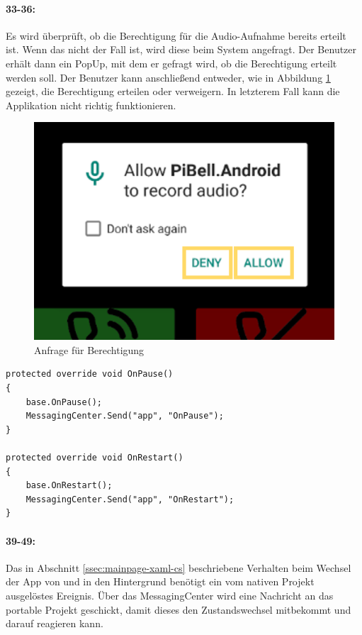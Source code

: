 \paragraph{33-36:} Es wird überprüft, ob die Berechtigung für die Audio-Aufnahme bereits erteilt ist.
Wenn das nicht der Fall ist, wird diese beim System angefragt.
Der Benutzer erhält dann ein PopUp, mit dem er gefragt wird, ob die Berechtigung erteilt werden soll.
Der Benutzer kann anschließend entweder, wie in Abbildung \ref{fig:permission} gezeigt, die Berechtigung erteilen oder verweigern.
In letzterem Fall kann die Applikation nicht richtig funktionieren.
\begin{figure}
    \centering
    \includegraphics[width=.5\linewidth]{images/xamarin/permissionRequest.png}
    \caption{Anfrage für Berechtigung}
    \label{fig:permission}
\end{figure}

\begin{verbatim}
protected override void OnPause()
{
    base.OnPause();
    MessagingCenter.Send("app", "OnPause");
}

protected override void OnRestart()
{
    base.OnRestart();
    MessagingCenter.Send("app", "OnRestart");
}
\end{verbatim}
\paragraph{39-49:} Das in Abschnitt \ref{ssec:mainpage-xaml-cs} beschriebene Verhalten beim Wechsel der App von und in den Hintergrund benötigt ein vom nativen Projekt ausgelöstes Ereignis.
Über das MessagingCenter wird eine Nachricht an das portable Projekt geschickt, damit dieses den Zustandswechsel mitbekommt und darauf reagieren kann.
